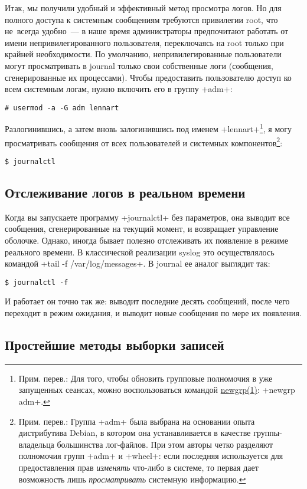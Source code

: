 \documentclass[10pt,oneside,a4paper]{article}
\begin{document}
Итак, мы получили удобный и эффективный метод просмотра логов. Но для полного
доступа к системным сообщениям требуются привилегии root, что не~всегда
удобно~--- в наше время администраторы предпочитают работать от имени
непривилегированного пользователя, переключаясь на root только при крайней
необходимости. По умолчанию, непривилегированные пользователи могут
просматривать в journal только свои собственные логи (сообщения, сгенерированные
их процессами). Чтобы предоставить пользователю доступ ко всем системным логам,
нужно включить его в группу +adm+:
\begin{Verbatim}
# usermod -a -G adm lennart
\end{Verbatim}
Разлогинившись, а затем вновь залогинившись под именем +lennart+\footnote{Прим.
перев.: Для того, чтобы обновить групповые полномочия в уже запущенных сеансах,
можно воспользоваться командой
\href{http://linux.die.net/man/1/newgrp}{newgrp(1)}: +newgrp adm+.}, я могу
просматривать сообщения от всех пользователей и системных
компонентов\footnote{Прим. перев.: Группа +adm+ была выбрана на основании опыта
дистрибутива Debian, в котором она устанавливается в качестве группы-владельца
большинства лог-файлов. При этом авторы четко разделяют полномочия групп +adm+ и
+wheel+: если последняя используется для предоставления прав \emph{изменять}
что-либо в системе, то первая дает возможность лишь \emph{просматривать}
системную информацию.}:
\begin{Verbatim}
$ journalctl
\end{Verbatim}

\subsection{Отслеживание логов в реальном времени}

Когда вы запускаете программу +journalctl+ без параметров, она выводит все
сообщения, сгенерированные на текущий момент, и возвращает управление оболочке.
Однако, иногда бывает полезно отслеживать их появление в режиме реального
времени. В классической реализации syslog это осуществлялось командой
+tail -f /var/log/messages+. В journal ее аналог выглядит так:
\begin{Verbatim}
$ journalctl -f
\end{Verbatim}
И работает он точно так же: выводит последние десять сообщений, после чего
переходит в режим ожидания, и выводит новые сообщения по мере их появления.

\subsection{Простейшие методы выборки записей}
\end{document}
